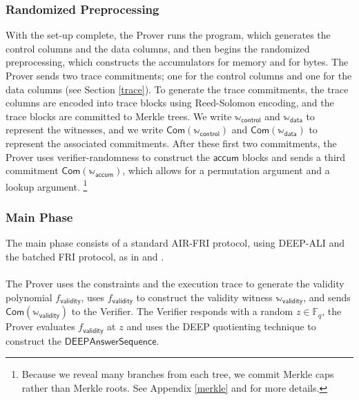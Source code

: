 \documentclass[10pt,letterpaper,titlepage]{article}
\newcommand{\GF}[1]{\mathbb{F}_{#1}}
\theoremstyle{definition}
\begin{document}
\subsubsection{Randomized Preprocessing}
With the set-up complete, the Prover runs the program, which generates the control columns and the data columns, and then begins the randomized preprocessing, which constructs the accumulators for memory and for bytes.
The Prover sends two trace commitments; one for the control columns and one for the data columns (see Section \ref{trace}).
To generate the trace commitments, the trace columns are encoded into trace blocks using Reed-Solomon encoding, and the trace blocks are committed to Merkle trees.
We write $\mathbb{w}_\mathsf{control}$ and $\mathbb{w}_\mathsf{data}$ to represent the witnesses,
and we write $\mathsf{Com}(\mathbb{w}_\mathsf{control})$ and $\mathsf{Com}(\mathbb{w}_\mathsf{data})$ to represent the associated commitments.
After these first two commitments, the Prover uses verifier-randomness to construct the $\mathsf{accum}$ blocks and sends a third commitment $\mathsf{Com}(\mathbb{w}_\mathsf{accum})$, which allows for a permutation argument and a lookup argument.%
%
\footnote{Because we reveal many branches from each tree, we commit Merkle caps rather than Merkle roots.
See Appendix \ref{merkle} and \cite{merklecap} for more details.}

\subsubsection{Main Phase}
The main phase consists of a standard AIR-FRI protocol, using DEEP-ALI\cite{deepFRI} and the batched FRI protocol\cite{proxGaps}, as in \cite{ethSTARK} and \cite{plonky2}.\\
\\
The Prover uses the constraints and the execution trace to generate the validity polynomial $f_\mathsf{validity}$,
uses $f_\mathsf{validity}$ to construct the validity witness $\mathbb{w}_\mathsf{validity}$,
and sends $\mathsf{Com}(\mathbb{w}_\mathsf{validity})$ to the Verifier.
The Verifier responds with a random $z\in\GF{q}$,
the Prover evaluates $f_\mathsf{validity}$ at $z$ and uses the DEEP quotienting technique to construct the $\mathsf{DEEPAnswerSequence}.$
\end{document}
